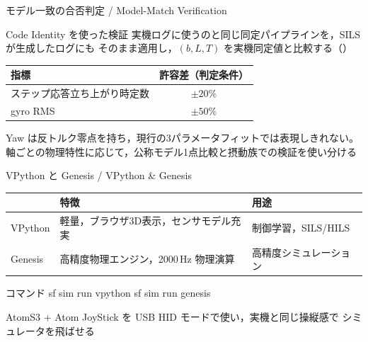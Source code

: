 \begin{frame}{モデル一致の合否判定 / Model-Match Verification}
  \begin{block}{Code Identity を使った検証}\small
    実機ログに使うのと同じ同定パイプラインを，SILS が生成したログにも
    そのまま適用し，$(b, L, T)$ を実機同定値と比較する（）
  \end{block}

  \vspace{0.5em}

  \begin{table}
    \centering\small
    \begin{tabular}{lc}
      \hline
      \textbf{指標} & \textbf{許容差（判定条件）} \\
      \hline
      ステップ応答立ち上がり時定数 & $\pm20\%$ \\
      gyro RMS & $\pm50\%$ \\
      \hline
    \end{tabular}
  \end{table}

  {\footnotesize Yaw は反トルク零点を持ち，現行の3パラメータフィットでは表現しきれない。
  軸ごとの物理特性に応じて，公称モデル1点比較と摂動族での検証を使い分ける}
\end{frame}

\begin{frame}[fragile]{VPython と Genesis / VPython \& Genesis}
  \begin{table}
    \centering\small
    \begin{tabular}{lll}
      \hline
      & \textbf{特徴} & \textbf{用途} \\
      \hline
      VPython & 軽量，ブラウザ3D表示，センサモデル充実 & 制御学習，SILS/HILS\footnotemark \\
      Genesis & 高精度物理エンジン，2000\,Hz 物理演算 & 高精度シミュレーション \\
      \hline
    \end{tabular}
  \end{table}

  \vspace{0.5em}

  \begin{sflisting}[basicstyle=\ttfamily\scriptsize]{コマンド}
sf sim run vpython
sf sim run genesis
  \end{sflisting}

  {\footnotesize AtomS3 + Atom JoyStick を USB HID モードで使い，実機と同じ操縦感で
  シミュレータを飛ばせる}
\end{frame}

